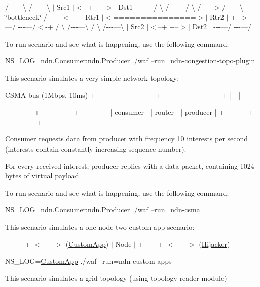 /-\/-\/-\/---\textbackslash{} /-\/-\/-\/---\textbackslash{} $\vert$ Src1 $\vert$$<$--+ +--$>$$\vert$ Dst1 $\vert$ -\/-\/-\/---/ \textbackslash{} / -\/-\/-\/---/ \textbackslash{} / +--$>$/-\/-\/-\/---\textbackslash{} \char`\"{}bottleneck\char`\"{} /-\/-\/-\/---$<$-\/+ $\vert$ Rtr1 $\vert$$<$===============$>$$\vert$ Rtr2 $\vert$ +--$>$-\/-\/-\/---/ -\/-\/-\/---/$<$-\/+ / \textbackslash{} /-\/-\/-\/---\textbackslash{} / \textbackslash{} /-\/-\/-\/---\textbackslash{} $\vert$ Src2 $\vert$$<$--+ +--$>$$\vert$ Dst2 $\vert$ -\/-\/-\/---/ -\/-\/-\/---/

To run scenario and see what is happening, use the following command\+: \begin{DoxyVerb}NS_LOG=ndn.Consumer:ndn.Producer ./waf --run=ndn-congestion-topo-plugin\end{DoxyVerb}


This scenario simulates a very simple network topology\+: \begin{DoxyVerb}                       CSMA bus (1Mbps, 10ms)
      +--------------------------+--------------------------+
      |                          |                          |

 +----------+                +--------+                +----------+
 | consumer |                | router |                | producer |
 +----------+                +--------+                +----------+
\end{DoxyVerb}


Consumer requests data from producer with frequency 10 interests per second (interests contain constantly increasing sequence number).

For every received interest, producer replies with a data packet, containing 1024 bytes of virtual payload.

To run scenario and see what is happening, use the following command\+: \begin{DoxyVerb}NS_LOG=ndn.Consumer:ndn.Producer ./waf --run=ndn-csma\end{DoxyVerb}


This scenario simulates a one-\/node two-\/custom-\/app scenario\+:

+-\/-\/-\/---+ $<$-\/-\/---$>$ (\hyperlink{classns3_1_1CustomApp}{Custom\+App}) $\vert$ Node $\vert$ +-\/-\/-\/---+ $<$-\/-\/---$>$ (\hyperlink{classns3_1_1Hijacker}{Hijacker})

N\+S\+\_\+\+L\+OG=\hyperlink{classns3_1_1CustomApp}{Custom\+App} ./waf --run=ndn-\/custom-\/apps

This scenario simulates a grid topology (using topology reader module)

